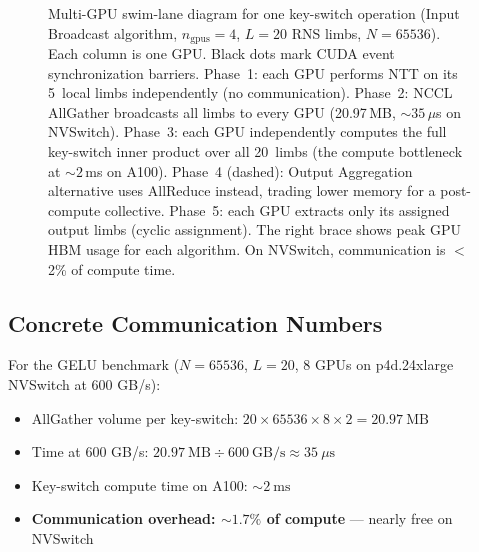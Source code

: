 \documentclass[11pt,letterpaper]{article}
\begin{document}
\begin{figure}[p]
\caption{Multi-GPU swim-lane diagram for one key-switch operation
  (Input Broadcast algorithm, $n_\text{gpus}{=}4$, $L{=}20$ RNS
  limbs, $N{=}65536$).
  Each column is one GPU.
  Black dots mark CUDA event synchronization barriers.
  Phase~1: each GPU performs NTT on its 5~local limbs independently
  (no communication).
  Phase~2: NCCL AllGather broadcasts all limbs to every GPU
  (20.97\,MB, ${\sim}35\,\mu$s on NVSwitch).
  Phase~3: each GPU independently computes the full key-switch inner
  product over all 20~limbs (the compute bottleneck at ${\sim}2$\,ms
  on A100).
  Phase~4 (dashed): Output Aggregation alternative uses AllReduce
  instead, trading lower memory for a post-compute collective.
  Phase~5: each GPU extracts only its assigned output limbs (cyclic
  assignment).
  The right brace shows peak GPU HBM usage for each algorithm.
  On NVSwitch, communication is $<$2\% of compute time.}
\label{fig:ks-swimlane}
\end{figure}

\subsection{Concrete Communication Numbers}

For the GELU benchmark ($N=65536$, $L=20$, 8 GPUs on p4d.24xlarge NVSwitch at 600 GB/s):

\begin{itemize}
  \item AllGather volume per key-switch: $20 \times 65536 \times 8 \times 2 = 20.97\ \text{MB}$
  \item Time at 600 GB/s: $20.97\ \text{MB} \div 600\ \text{GB/s} \approx 35\ \mu\text{s}$
  \item Key-switch compute time on A100: $\sim 2\ \text{ms}$
  \item \textbf{Communication overhead: $\sim 1.7\%$ of compute} --- nearly free on NVSwitch
\end{itemize}
\end{document}

